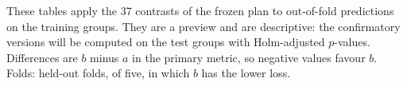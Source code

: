 \documentclass[10pt]{article}
\begin{document}
These tables apply the 37 contrasts of the frozen plan to out-of-fold predictions on the training groups. They are a
preview and are descriptive: the confirmatory versions will be computed on the test groups with Holm-adjusted
$p$-values. Differences are $b$ minus $a$ in the primary metric, so negative values favour $b$. Folds: held-out folds,
of five, in which $b$ has the lower loss.

\begin{table}[H]
\centering\scriptsize
\caption{Objective~1: difference in out-of-fold NLL with 95\% paired bootstrap intervals over the 57 training groups.}
\setlength{\tabcolsep}{4pt}

\end{table}

\begin{table}[H]
\centering\scriptsize
\caption{Objective~2: difference in out-of-fold RMSE, as the previous table.}
\setlength{\tabcolsep}{4pt}

\end{table}
\end{document}
